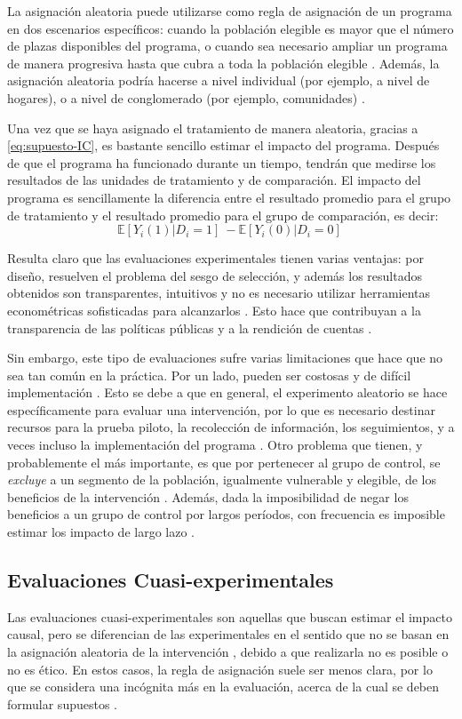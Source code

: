 \documentclass[../../main.tex]{subfiles}
\begin{document}
La asignación aleatoria puede utilizarse como regla de asignación de un programa en dos escenarios específicos: cuando la población elegible es mayor que el número de plazas disponibles del programa, o  cuando sea necesario ampliar un programa de manera progresiva hasta que cubra a toda la población elegible \cite{gertler-2016}. Además, la asignación aleatoria podría hacerse a nivel individual (por ejemplo, a nivel de hogares), o a nivel de conglomerado (por ejemplo, comunidades) \cite{bernal}.

Una vez que se haya asignado el tratamiento de manera aleatoria, gracias a \ref{eq:supuesto-IC}, es bastante sencillo estimar el impacto del programa. Después de que el programa ha funcionado durante un tiempo, tendrán que medirse los resultados de las unidades de tratamiento y de comparación. El impacto del programa es sencillamente la diferencia entre el resultado promedio para el grupo de tratamiento y el resultado promedio para el grupo de comparación, es decir:
\[
\mathbb{E} \left[Y_i(1)|D_i=1\right]\ - \mathbb{E} \left[Y_i(0)|D_i=0\right]\
\]

Resulta claro que las evaluaciones experimentales tienen varias ventajas: por diseño, resuelven el problema del sesgo de selección, y además los resultados obtenidos son transparentes, intuitivos y no es necesario utilizar herramientas econométricas sofisticadas para alcanzarlos \cite{bernal}. Esto hace que contribuyan a la transparencia de las políticas públicas y a la rendición de cuentas \cite{bernal}.

Sin embargo, este tipo de evaluaciones sufre varias limitaciones que hace que no sea tan común en la práctica. Por un lado, pueden ser costosas y de difícil implementación \cite{bernal}. Esto se debe a que en general, el experimento aleatorio se hace específicamente para evaluar una intervención, por lo que es necesario destinar recursos para la prueba piloto, la recolección de información, los seguimientos, y a veces incluso la implementación del programa \cite{bernal}. Otro problema que tienen, y probablemente el más importante, es que por pertenecer al grupo de control, se \textit{excluye} a un segmento de la población, igualmente vulnerable y elegible, de los beneficios de la intervención \cite{bernal}. Además, dada la imposibilidad de negar los beneficios a un grupo de control por largos períodos, con frecuencia es imposible estimar los impacto de largo lazo \cite{bernal}.   

\subsection{Evaluaciones Cuasi-experimentales}
Las evaluaciones cuasi-experimentales son aquellas que buscan estimar el impacto causal, pero se diferencian de las experimentales en el sentido que no se basan en la asignación aleatoria de la intervención \cite{gertler-2016}, debido a que realizarla no es posible o no es ético. En estos casos, la regla de asignación suele ser menos clara, por lo que se considera una incógnita más en la evaluación, acerca de la cual se deben formular supuestos \cite{gertler-2016}.
\end{document}
